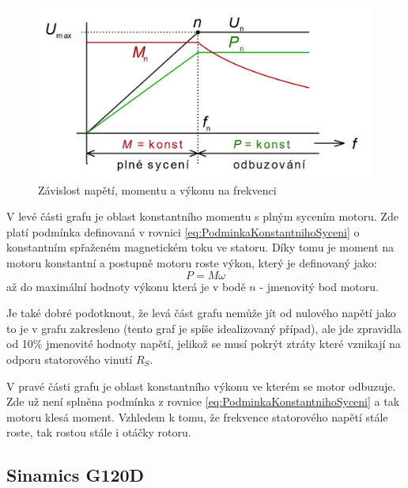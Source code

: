 \begin{figure}[hptb]
	\centering
	\includegraphics[width=1\linewidth]{images/ProvozniRezimyAMSFrekvencnimMenicem}
	\caption{Závislost napětí, momentu a výkonu na frekvenci \cite{SkriptaRizeniOtacekAM}}
	\label{fig:provoznirezimyamsfrekvencnimmenicem}
\end{figure}

V levé části grafu je oblast konstantního momentu s plným sycením motoru. Zde platí podmínka definovaná v rovnici \ref{eq:PodminkaKonstantnihoSyceni} o konstantním spřaženém magnetickém toku ve statoru. Díky tomu je moment na motoru konstantní a postupně motoru roste výkon, který je definovaný jako:
\begin{equation}
	P = M\omega
	\label{eq:vykonmotoru}
\end{equation}
až do maximální hodnoty výkonu která je v bodě $n$ - jmenovitý bod motoru.

Je také dobré podotknout, že levá část grafu nemůže jít od nulového napětí jako to je v grafu zakresleno (tento graf je spíše idealizovaný případ), ale jde zpravidla od 10\% jmenovité hodnoty napětí, jelikož se musí pokrýt ztráty které vznikají na odporu statorového vinutí $R_S$. \cite{SkriptaRizeniOtacekAM}

V pravé části grafu je oblast konstantního výkonu ve kterém se motor odbuzuje. Zde už není splněna podmínka z rovnice \ref{eq:PodminkaKonstantnihoSyceni} a tak motoru klesá moment. Vzhledem k tomu, že frekvence statorového napětí stále roste, tak rostou stále i otáčky rotoru.

\subsection{Sinamics G120D}

